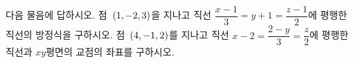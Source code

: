 다음 물음에 답하시오.
 점~$(1{,}\mkern3mu\mathopen{}-2{,}\mkern3mu\mathopen{}3)$을 지나고 직선 $\dfrac{x-1}{3}=y+1=\dfrac{z-1}{2}$에 평행한 직선의 방정식을 구하시오.
 점~$(4{,}\mkern3mu\mathopen{}-1{,}\mkern3mu\mathopen{}2)$를 지나고 직선 $x-2=\dfrac{2-y}{3}=\dfrac{z}{2}$에 평행한 직선과 $xy$평면의 교점의 좌표를 구하시오.
